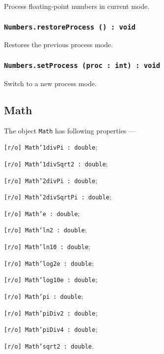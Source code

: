 Process floating-point numbers in current mode.

\subsubsection{\texttt{Numbers.restoreProcess () : void}}

Restores the previous process mode.

\subsubsection{\texttt{Numbers.setProcess (proc : int) : void}}

Switch to a new process mode.

\subsection{Math}

The object \texttt{Math} has following properties —
\begin{icItems}
	\item \texttt{[r/o] Math'1divPi : double};
	\item \texttt{[r/o] Math'1divSqrt2 : double};
	\item \texttt{[r/o] Math'2divPi : double};
	\item \texttt{[r/o] Math'2divSqrtPi : double};
	\item \texttt{[r/o] Math'e : double};
	\item \texttt{[r/o] Math'ln2 : double};
	\item \texttt{[r/o] Math'ln10 : double};
	\item \texttt{[r/o] Math'log2e : double};
	\item \texttt{[r/o] Math'log10e : double};
	\item \texttt{[r/o] Math'pi : double};
	\item \texttt{[r/o] Math'piDiv2 : double};
	\item \texttt{[r/o] Math'piDiv4 : double};
	\item \texttt{[r/o] Math'sqrt2 : double}.
\end{icItems}

